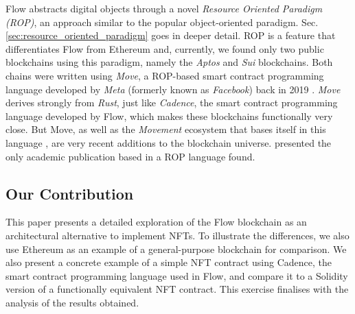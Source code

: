 \documentclass[../NFTComp_IEEE.tex]{subfiles}
\begin{document}
Flow abstracts digital objects through a novel \textit{Resource Oriented Paradigm (ROP)}, an approach similar to the popular object-oriented paradigm. Sec. \ref{sec:resource_oriented_paradigm} goes in deeper detail. ROP is a feature that differentiates Flow from Ethereum and, currently, we found only two public blockchains using this paradigm, namely the \textit{Aptos} \cite{Aptos2022} and \textit{Sui} \cite{Sui2023} blockchains. Both chains were written using \textit{Move}, a ROP-based smart contract programming language developed by \textit{Meta} (formerly known as \textit{Facebook}) back in 2019 \cite{daic2024}. \textit{Move} derives strongly from \textit{Rust}, just like \textit{Cadence}, the smart contract programming language developed by Flow, which makes these blockchains functionally very close. But Move, as well as the \textit{Movement} ecosystem that bases itself in this language \cite{Movement2024}, are very recent additions to the blockchain universe. \cite{Benetollo2023} presented the only academic publication based in a ROP language found.

\subsection{Our Contribution}
This paper presents a detailed exploration of the Flow blockchain as an architectural alternative to implement NFTs. To illustrate the differences, we also use Ethereum as an example of a general-purpose blockchain for comparison. We also present a concrete example of a simple NFT contract using Cadence, the smart contract programming language used in Flow, and compare it to a Solidity version of a functionally equivalent NFT contract. This exercise finalises with the analysis of the results obtained.
\end{document}
